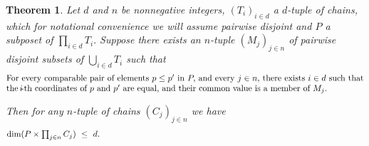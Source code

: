 \documentclass{amsart}
\newtheorem{theorem}{Theorem}
\numberwithin{equation}{section}
\numberwithin{theorem}{section}
\newcommand{\2}{\mathbf{2}}
\begin{document}
\begin{theorem}\label{T.main}
Let $d$ and $n$ be nonnegative integers, $(T_i)_{i\in d}$ a
$\!d\!$-tuple of chains, which for notational convenience we will
assume pairwise disjoint and $P$ a subposet of $\prod_{i\in d} T_i.$
Suppose there exists an $\!n\!$-tuple $(M_j)_{j\in n}$ of
pairwise disjoint subsets of $\bigcup_{i\in d} T_i$ such that
%
\begin{equation}\begin{minipage}[c]{35pc}\label{d.eq_coord}
For every comparable pair of elements $p\leq p'$
in $P,$ and every $j\in n,$ there exists $i\in d$ such
that the $\!i\!$-th coordinates of $p$ and $p'$ are equal,
and their common value is a member of $M_j.$
\end{minipage}\end{equation}

Then for any $\!n\!$-tuple of chains $(C_j)_{j\in n}$ we have
%
\begin{equation}\begin{minipage}[c]{35pc}\label{d.main}
$\dim(P\times\prod_{j\in n} C_j)\ \leq\ d.$
\end{minipage}\end{equation}
%
\end{theorem}
\end{document}
